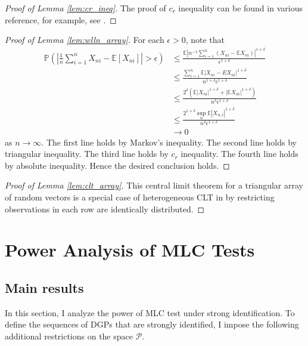 \documentclass[11pt]{article}
\theoremstyle{definition}
\newcommand{\Exp}{\ensuremath{\mathbb{E}}} %
\newcommand{\Prob}{\ensuremath{\mathbb{P}}} %
\newcommand{\0}{\ensuremath{\mathbf{0}}}
\begin{document}
\begin{bibunit}
\begin{proof}[Proof of Lemma \ref{lem:cr_ineq}]
The proof of $c_r$ inequality can be found in various reference, for example, see \citet[Proposition 3.8]{white:1999}.
\end{proof}



\begin{proof}[Proof of Lemma \ref{lem:wlln_array}]
	For each $\epsilon > 0$, note that 
\begin{align*}
	\Prob\left(\left|\frac{1}{n} \sum_{i=1}^n X_{ni} - \Exp[X_{ni}]\right| > \epsilon \right)
	&\leq \frac{\Exp|n^{-1}\sum_{i=1}^n (X_{ni} - \Exp X_{ni})|^{1+\delta}}{\epsilon^{1+\delta}} \\
	&\leq \frac{\sum_{i=1}^n \Exp|X_{ni} - EX_{ni}|^{1+\delta}}{n^{1+\delta}\epsilon^{1+\delta}} \\
	&\leq \frac{2^{\delta} \left(\Exp|X_{ni}|^{1+\delta} + |\Exp X_{ni}|^{1+\delta}\right)}{n^{\delta} \epsilon^{1+\delta}} \\
	&\leq \frac{2^{1+\delta} \sup_{n}\Exp |X_{n,i}|^{1+\delta}}{n^{\delta}\epsilon^{1+\delta}} \\
	&\to 0
\end{align*}
as $n\to \infty$. The first line holds by Markov's inequality. The second line holds by triangular inequality. The third line holds by $c_r$ inequality. The fourth line holds by absolute inequality. Hence the desired conclusion holds.
\end{proof}

\begin{proof}[Proof of Lemma \ref{lem:clt_array}]
This central limit theorem for a triangular array of random vectors is a special case of heterogeneous CLT in \citet[Theorem 9.4]{hansen:2022} by restricting observations in each row are identically distributed.
\end{proof}


%


\newpage

%
\section{Power Analysis of MLC Tests}
\label{appendix:power_analysis_MLC}
\subsection{Main results}
In this section, I analyze the power of MLC test under strong identification. To define the sequences of DGPs that are strongly identified, I impose the following additional restrictions on the space $\mathcal{P}$. 


\end{bibunit}
\end{document}
